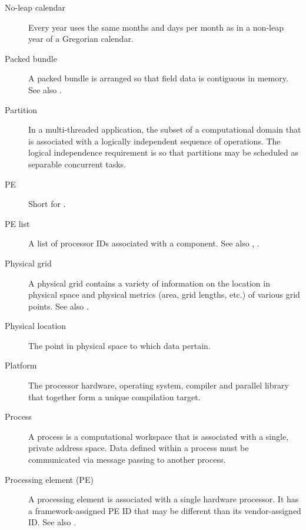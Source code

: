 \begin{description}
\item [No-leap calendar] \label{glos:NoLeap} Every year uses the same months 
  and days per month as in a non-leap year of a Gregorian calendar.

\item[Packed bundle] \label{glos:PackedBundle} A packed bundle is arranged
  so that field data is contiguous in memory. See also .

\item[Partition] \label{glos:Partition} In a multi-threaded application, the subset of a
  computational domain that is associated with a logically independent
  sequence of operations. The logical independence requirement is so
  that partitions may be scheduled as separable concurrent tasks.

\item[PE] \label{glos:PE} Short for .

\item[PE list] \label{glos:PEList} A list of processor IDs associated 
  with a component.  See also , .

\item[Physical grid] \label{term:PhysGrid} 
  A physical grid contains a variety of information on the location 
  in physical space and physical metrics (area, grid lengths, etc.) 
  of various grid points. See also . 

\item[Physical location] \label{glos:PhysLoc} The point in physical space 
  to which data pertain. 

\item[Platform] \label{glos:Platform} 
  The processor hardware, operating system, compiler and
  parallel library that together form a unique compilation target.

\item[Process] \label{glos:Process}
  A process is a computational workspace that is associated with a single,
  private address space. Data defined within a process must be communicated
  via message passing to another process.

\item[Processing element (PE)] \label{glos:Processing_Element}
  A processing element is associated with a single hardware processor.  It 
  has a framework-assigned PE ID that may be different than its 
  vendor-assigned ID.
  See also .  


\end{description}
